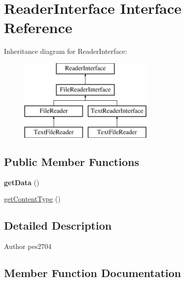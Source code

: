 \hypertarget{interface_pes_1_1_readers_1_1_reader_interface}{}\section{Reader\+Interface Interface Reference}
\label{interface_pes_1_1_readers_1_1_reader_interface}
Inheritance diagram for Reader\+Interface\+:\begin{figure}[H]
\begin{center}
\leavevmode
\includegraphics[height=4.000000cm]{interface_pes_1_1_readers_1_1_reader_interface}
\end{center}
\end{figure}
\subsection*{Public Member Functions}
\begin{DoxyCompactItemize}
\item 
\mbox{\label{interface_pes_1_1_readers_1_1_reader_interface_a81a67162a6288d78fc4c55283325f0b4}} 
{\bfseries get\+Data} ()
\item 
\mbox{\hyperlink{interface_pes_1_1_readers_1_1_reader_interface_aa843137beb02bc2516fe0551c00ff7d7}{get\+Content\+Type}} ()
\end{DoxyCompactItemize}


\subsection{Detailed Description}
\begin{DoxyAuthor}{Author}
pes2704 
\end{DoxyAuthor}


\subsection{Member Function Documentation}
\mbox{\label{interface_pes_1_1_readers_1_1_reader_interface_aa843137beb02bc2516fe0551c00ff7d7}} 
